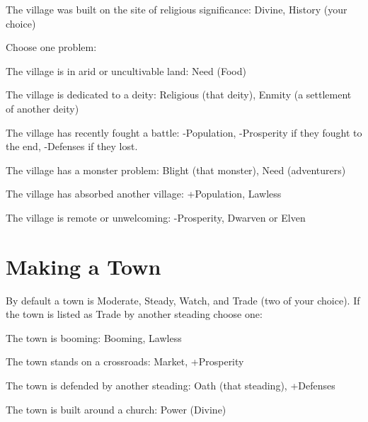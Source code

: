          
\item The village was built on the site of religious significance: Divine, History (your choice)

       
\stopitemize
       

Choose one problem:

       
\startitemize[1,packed]
         
\item The village is in arid or uncultivable land: Need (Food)

         
\item The village is dedicated to a deity: Religious (that deity), Enmity (a settlement of another deity)

         
\item The village has recently fought a battle: -Population, -Prosperity if they fought to the end, -Defenses if they lost.

         
\item The village has a monster problem: Blight (that monster), Need (adventurers)

         
\item The village has absorbed another village: +Population, Lawless

         
\item The village is remote or unwelcoming: -Prosperity, Dwarven or Elven

       
\stopitemize
       
\section{Making a Town}   
       

By default a town is Moderate, Steady, Watch, and Trade (two of your choice). If the town is listed as Trade by another steading choose one:

       
\startitemize[1,packed]
         
\item The town is booming: Booming, Lawless

         
\item The town stands on a crossroads: Market, +Prosperity

         
\item The town is defended by another steading: Oath (that steading), +Defenses

         
\item The town is built around a church: Power (Divine)

